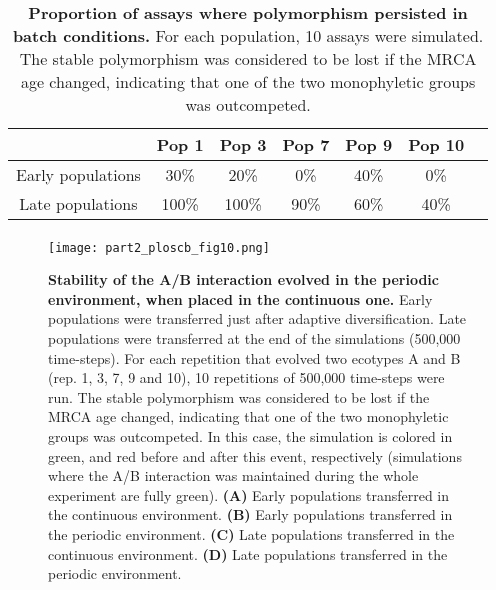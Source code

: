 \begin{table}[!ht]
\begin{adjustwidth}{-0in}{0in}
\centering
\caption[Proportion of assays where polymorphism persisted in batch conditions.]{{\bf Proportion of assays where polymorphism persisted in batch conditions.} For each population, 10 assays were simulated. The stable polymorphism was considered to be lost if the MRCA age changed, indicating that one of the two monophyletic groups was outcompeted.}
\begin{tabular}{|c|c|c|c|c|c|c|}
\hline
 & Pop 1 & Pop 3 & Pop 7 & Pop 9 & Pop 10\\
\hline
Early populations & 30\% & 20\% & 0\% & 40\% & 0\%\\
\hline
Late populations & 100\% & 100\% & 90\% & 60\% & 40\%\\
\hline
\end{tabular}
\label{table:part2:first_result:table2}
\end{adjustwidth}
\end{table}

\begin{figure}[!h]
\centering
\paragraph{}
\paragraph{}
\paragraph{}
\texttt{[image: part2\_ploscb\_fig10.png]}
\caption[Stability of the A/B interaction evolved in the periodic environment, when placed in the continuous one.]{{\bf Stability of the A/B interaction evolved in the periodic environment, when placed in the continuous one.} Early populations were transferred just after adaptive diversification. Late populations were transferred at the end of the simulations (500,000 time-steps). For each repetition that evolved two ecotypes A and B (rep. 1, 3, 7, 9 and 10), 10 repetitions of 500,000 time-steps were run. The stable polymorphism was considered to be lost if the MRCA age changed, indicating that one of the two monophyletic groups was outcompeted. In this case, the simulation is colored in green, and red before and after this event, respectively (simulations where the A/B interaction was maintained during the whole experiment are fully green). {\bf (A)} Early populations transferred in the continuous environment. {\bf (B)} Early populations transferred in the periodic environment. {\bf (C)} Late populations transferred in the continuous environment. {\bf (D)} Late populations transferred in the periodic environment.}
\label{fig:part2:first_result:Fig10}
\end{figure}

